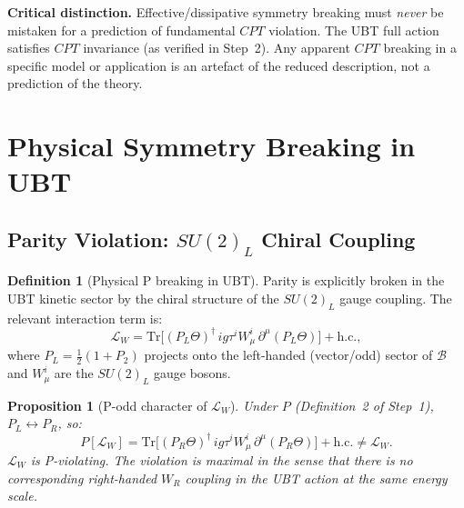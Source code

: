 \documentclass[12pt,a4paper]{article}
\newtheorem{proposition}[theorem]{Proposition}
\theoremstyle{definition}
\newtheorem{definition}[theorem]{Definition}
\theoremstyle{remark}
\begin{document}
\begin{warnbox}
\textbf{Critical distinction.}
Effective/dissipative symmetry breaking must \emph{never} be mistaken for a
prediction of fundamental $CPT$ violation.
The UBT full action satisfies $CPT$ invariance (as verified in Step~2).
Any apparent $CPT$ breaking in a specific model or application is an artefact
of the reduced description, not a prediction of the theory.
\end{warnbox}

\section{Physical Symmetry Breaking in UBT}
\label{sec:cat:physical}

\subsection{Parity Violation: $SU(2)_L$ Chiral Coupling}
\label{subsec:cat:parity}

\begin{definition}[Physical P breaking in UBT]
\label{def:cat:P_breaking}
Parity is explicitly broken in the UBT kinetic sector by the chiral structure
of the $SU(2)_L$ gauge coupling.  The relevant interaction term is:
\begin{equation}
  \mathcal{L}_{W} = \mathrm{Tr}\!\bigl[
    (P_L\Theta)^\dagger \,ig\tau^i W^i_\mu\, \partial^\mu(P_L\Theta)
  \bigr] + \mathrm{h.c.},
  \label{eq:cat:L_W}
\end{equation}
where $P_L = \tfrac{1}{2}(1 + P_2)$ projects onto the left-handed
(vector/odd) sector of $\mathcal{B}$ and $W^i_\mu$ are the $SU(2)_L$ gauge
bosons.
\end{definition}

\begin{proposition}[P-odd character of $\mathcal{L}_W$]
Under $P$ (Definition~2 of Step~1), $P_L \leftrightarrow P_R$, so:
\begin{equation}
  P[\mathcal{L}_W] = \mathrm{Tr}\!\bigl[
    (P_R\Theta)^\dagger \,ig\tau^i W^i_\mu\, \partial^\mu(P_R\Theta)
  \bigr] + \mathrm{h.c.} \neq \mathcal{L}_W.
\end{equation}
$\mathcal{L}_W$ is P-violating.  The violation is maximal in the sense that
there is no corresponding right-handed $W_R$ coupling in the UBT action at the
same energy scale.
\end{proposition}
\end{document}
